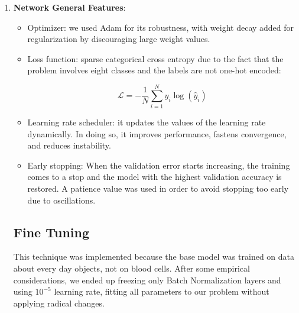 \documentclass[11pt]{article}
\begin{document}
\begin{multicols}{2}
\begin{enumerate}
\begin{itemize}
              \end{itemize}
              
            \item \textbf{Network General Features}:
            \begin{itemize}
            
                \item Optimizer: we used Adam for its robustness, with weight decay added for regularization by discouraging large weight values.
                
                \item Loss function: sparse categorical cross entropy due to the fact that the problem involves eight classes and the labels are not one-hot encoded:
                
                \[
                \mathcal{L} = -\frac{1}{N}\sum_{i=1}^{N} y_i\log(\hat{y}_i)
                \]
                
                \item Learning rate scheduler: it updates the values of the learning rate dynamically. In doing so, it improves performance, fastens convergence, and reduces instability.
                
                \item Early stopping: When the validation error starts increasing, the training comes to a stop and the model with the highest validation accuracy is restored. A patience value was used in order to avoid stopping too early due to oscillations.
                
            \end{itemize}

            \subsection{Fine Tuning}
            This technique was implemented because the base model was trained on data about every day objects, not on blood cells. After some empirical considerations, we ended up freezing only Batch Normalization layers and using $10^{-5}$ learning rate, fitting all parameters to our problem without applying radical changes.
             
        \end{enumerate}
            


\end{multicols}
\end{document}

